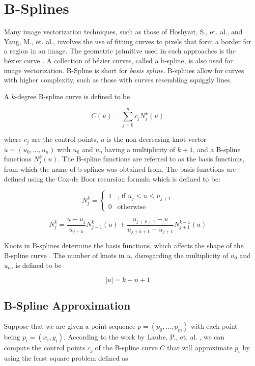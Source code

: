 \section{B-Splines}
Many image vectorization techniques, such as those of Hoshyari, S., et. al., and Yang, M., et. al., involves the use of fitting curves to pixels that form a border for a region in an image. The geometric primitive used in such approaches is the b\'ezier curve \cite{hoshyari2018perceptiondriven}\cite{effectiveclipartimagevectorization}\cite{depixelizingpixelart}. A collection of b\'ezier curves, called a b-spline, is also used for image vectorization. B-Spline is short for \textit{basis spline}. B-splines allow for curves with higher complexity, such as those with curves resembling squiggly lines.

A $k$-degree B-spline curve is defined to be

$$ C(u) = \sum_{j = 0}^{n}c_{j}N^{k}_{j}(u) $$

where $c_{j}$ are the control points, $u$ is the non-decreasing knot vector $u = (u_{0}, \ldots, u_{n})$ with $u_{0}$ and $u_{n}$ having a multiplicity of $k + 1$, and a B-spline functions $N^{k}_{j}(u)$. The B-spline functions are referred to as the basis functions, from which the name of b-splines was obtained from. The basis functions are defined using the Cox-de Boor recursion formula \cite{bsplines} which is defined to be:

$$ N^{k}_{j} = \begin{cases} 1&\text{, if } u_{j} \le u \le u_{j + 1} \\ 0&\text{otherwise} \end{cases} $$

$$ N^{k}_{j} = \frac{u - u_{j}}{u_{j + k}}N^{k}_{j - 1}(u) + \frac{u_{j + k + 1} - u}{u_{j + k + 1} - u_{j + 1}}N^{k - 1}_{j + 1}(u) $$

Knots in B-splines determine the basis functions, which affects the shape of the B-spline curve \cite{bsplines}. The number of knots in $u$, disregarding the multiplicity of $u_{0}$ and $u_{n}$, is defined to be

$$ \lvert u \rvert = k + n + 1 $$

\subsection{B-Spline Approximation}

Suppose that we are given a point sequence $p = (p_{0}, \ldots, p_{m})$ with each point being $p_{i} = (x_{i}, y_{i})$. According to the work by Laube, P., et. al. \cite{deeplearningparametrization}, we can compute the control points $c_{j}$ of the B-spline curve $C$ that will approximate $p_{i}$ by using the least square problem defined as

